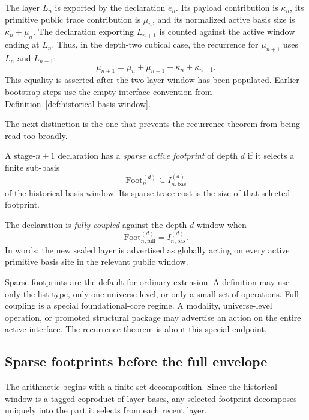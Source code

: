 \begin{remark}
\label{rem:scaling-indexing}
The layer \(L_n\) is exported by the declaration \(e_n\).  Its payload contribution is
\(\kappa_n\), its primitive public trace contribution is \(\mu_n\), and its normalized active
basis size is \(\kappa_n+\mu_n\).  The declaration exporting \(L_{n+1}\) is counted against
the active window ending at \(L_n\).  Thus, in the depth-two cubical case, the recurrence for
\(\mu_{n+1}\) uses \(L_n\) and \(L_{n-1}\):
\[
  \mu_{n+1}
  = \mu_n + \mu_{n-1} + \kappa_n + \kappa_{n-1}.
\]
This equality is asserted after the two-layer window has been populated.  Earlier bootstrap
steps use the empty-interface convention from Definition~\ref{def:historical-basis-window}.
\end{remark}

The next distinction is the one that prevents the recurrence theorem from being read too
broadly.

\begin{definition}
\label{def:sparse-footprint-full-coupling}
A stage-\(n+1\) declaration has a \emph{sparse active footprint} of depth \(d\) if it selects a
finite sub-basis
\[
  \mathrm{Foot}^{(d)}_n \subseteq I^{(d)}_{n,\mathrm{bas}}
\]
of the historical basis window.  Its sparse trace cost is the size of that selected footprint.

The declaration is \emph{fully coupled} against the depth-\(d\) window when
\[
  \mathrm{Foot}^{(d)}_{n,\mathrm{full}} = I^{(d)}_{n,\mathrm{bas}}.
\]
In words: the new sealed layer is advertised as globally acting on every active primitive basis
site in the relevant public window.
\end{definition}

Sparse footprints are the default for ordinary extension.  A definition may use only the
list type, only one universe level, or only a small set of operations.  Full coupling is a
special foundational-core regime.  A modality, universe-level operation, or promoted structural
package may advertise an action on the entire active interface.  The recurrence theorem is
about this special endpoint.

\subsection{Sparse footprints before the full envelope}
\label{subsec:sparse-footprints}

The arithmetic begins with a finite-set decomposition.  Since the historical window is a
tagged coproduct of layer bases, any selected footprint decomposes uniquely into the part it
selects from each recent layer.

